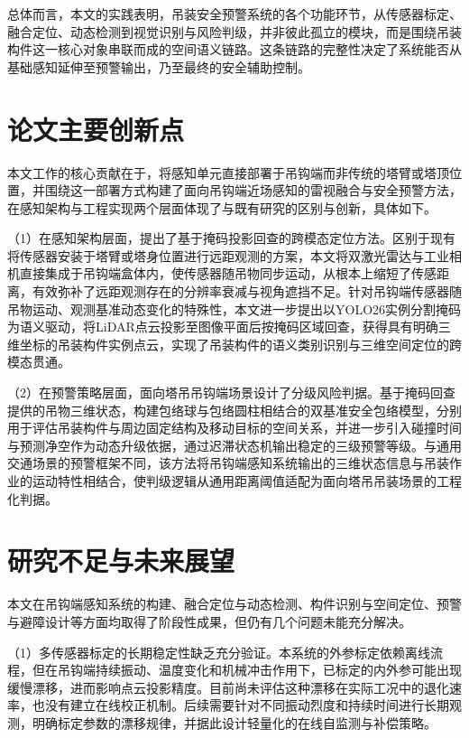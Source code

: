 总体而言，本文的实践表明，吊装安全预警系统的各个功能环节，从传感器标定、融合定位、动态检测到视觉识别与风险判级，并非彼此孤立的模块，而是围绕吊装构件这一核心对象串联而成的空间语义链路。这条链路的完整性决定了系统能否从基础感知延伸至预警输出，乃至最终的安全辅助控制。

\section{论文主要创新点}\label{sec_ch7_innovation}

本文工作的核心贡献在于，将感知单元直接部署于吊钩端而非传统的塔臂或塔顶位置，并围绕这一部署方式构建了面向吊钩端近场感知的雷视融合与安全预警方法，在感知架构与工程实现两个层面体现了与既有研究的区别与创新，具体如下。

（1）在感知架构层面，提出了基于掩码投影回查的跨模态定位方法。区别于现有将传感器安装于塔臂或塔身位置进行远距观测的方案，本文将双激光雷达与工业相机直接集成于吊钩端盒体内，使传感器随吊物同步运动，从根本上缩短了传感距离，有效弥补了远距观测存在的分辨率衰减与视角遮挡不足。针对吊钩端传感器随吊物运动、观测基准动态变化的特殊性，本文进一步提出以YOLO26实例分割掩码为语义驱动，将LiDAR点云投影至图像平面后按掩码区域回查，获得具有明确三维坐标的吊装构件实例点云，实现了吊装构件的语义类别识别与三维空间定位的跨模态贯通。

（2）在预警策略层面，面向塔吊吊钩端场景设计了分级风险判据。基于掩码回查提供的吊物三维状态，构建包络球与包络圆柱相结合的双基准安全包络模型，分别用于评估吊装构件与周边固定结构及移动目标的空间关系，并进一步引入碰撞时间与预测净空作为动态升级依据，通过迟滞状态机输出稳定的三级预警等级。与通用交通场景的预警框架不同，该方法将吊钩端感知系统输出的三维状态信息与吊装作业的运动特性相结合，使判级逻辑从通用距离阈值适配为面向塔吊吊装场景的工程化判据。

\section{研究不足与未来展望}\label{sec_ch7_outlook}

本文在吊钩端感知系统的构建、融合定位与动态检测、构件识别与空间定位、预警与避障设计等方面均取得了阶段性成果，但仍有几个问题未能充分解决。

（1）多传感器标定的长期稳定性缺乏充分验证。本系统的外参标定依赖离线流程，但在吊钩端持续振动、温度变化和机械冲击作用下，已标定的内外参可能出现缓慢漂移，进而影响点云投影精度。目前尚未评估这种漂移在实际工况中的退化速率，也没有建立在线校正机制。后续需要针对不同振动烈度和持续时间进行长期观测，明确标定参数的漂移规律，并据此设计轻量化的在线自监测与补偿策略。


